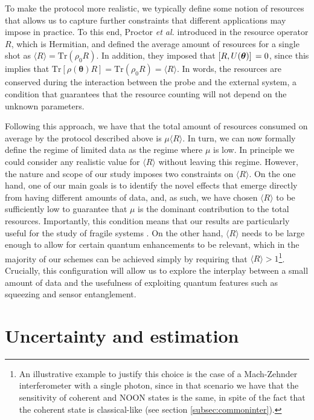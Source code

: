 To make the protocol more realistic, we typically define some notion of resources that allows us to capture further constraints that different applications may impose in practice. To this end, Proctor \emph{et al.} introduced in \cite{proctor2017networked} the resource operator $R$, which is Hermitian, and defined the average amount of resources for a single shot as $\langle R \rangle = \mathrm{Tr}(\rho_0 R)$. In addition, they imposed that $\comm*{R}{U(\boldsymbol{\theta})} = 0$, since this implies that $\mathrm{Tr}[\rho(\boldsymbol{\theta}) R] = \mathrm{Tr}(\rho_0 R) = \langle R \rangle$. In words, the resources are conserved during the interaction between the probe and the external system, a condition that guarantees that the resource counting will not depend on the unknown parameters. 

Following this approach, we have that the total amount of resources consumed on average by the protocol described above is $\mu \langle R \rangle$. In turn, we can now formally define the regime of limited data as the regime where $\mu$ is low. In principle we could consider any realistic value for $\langle R \rangle$ without leaving this regime. However, the nature and scope of our study imposes two constraints on $\langle R \rangle$. On the one hand, one of our main goals is to identify the novel effects that emerge directly from having different amounts of data, and, as such, we have chosen $\langle R \rangle$ to be sufficiently low to guarantee that $\mu$ is the dominant contribution to the total resources. Importantly, this condition means that our results are particularly useful for the study of fragile systems \cite{eckert2007, pototschnig2011, carlton2010, taylor2013, taylor2015, taylor2016, PaulProctor2016}. On the other hand, $\langle R \rangle$ needs to be large enough to allow for certain quantum enhancements to be relevant, which in the majority of our schemes can be achieved simply by requiring that $\langle R \rangle > 1$\footnote{An illustrative example to justify this choice is the case of a Mach-Zehnder interferometer with a single photon, since in that scenario we have that the sensitivity of coherent and NOON states is the same, in spite of the fact that the coherent state is classical-like (see section \ref{subsec:commoninter}).}. Crucially, this configuration will allow us to explore the interplay between a small amount of data and the usefulness of exploiting quantum features such as squeezing and sensor entanglement. 

\section{Uncertainty and estimation}
\label{sec:uncertainty}

